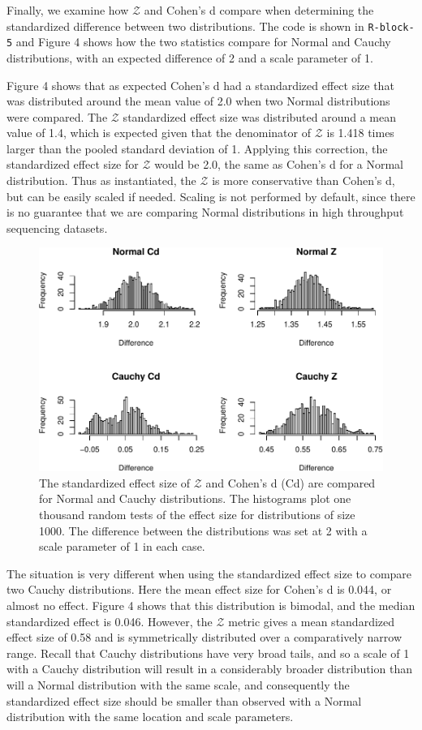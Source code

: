\documentclass[onecolumn]{article}
\begin{document}
Finally, we examine how \(\mathcal{Z}\) and Cohen's d compare when
determining the standardized difference between two distributions. The
code is shown in \texttt{R-block-5} and Figure 4 shows how the two
statistics compare for Normal and Cauchy distributions, with an expected
difference of 2 and a scale parameter of 1.

Figure 4 shows that as expected Cohen's d had a standardized effect size
that was distributed around the mean value of 2.0 when two Normal
distributions were compared. The \(\mathcal{Z}\) standardized effect
size was distributed around a mean value of 1.4, which is expected given
that the denominator of \(\mathcal{Z}\) is 1.418 times larger than the
pooled standard deviation of 1. Applying this correction, the
standardized effect size for \(\mathcal{Z}\) would be 2.0, the same as
Cohen's d for a Normal distribution. Thus as instantiated, the
\(\mathcal{Z}\) is more conservative than Cohen's d, but can be easily
scaled if needed. Scaling is not performed by default, since there is no
guarantee that we are comparing Normal distributions in high throughput
sequencing datasets.

\begin{figure}
\centering
\includegraphics{effect_supplement_files/figure-latex/R-block-5-1.pdf}
\caption{The standardized effect size of \(\mathcal{Z}\) and Cohen's d
(Cd) are compared for Normal and Cauchy distributions. The histograms
plot one thousand random tests of the effect size for distributions of
size 1000. The difference between the distributions was set at 2 with a
scale parameter of 1 in each case.}
\end{figure}

The situation is very different when using the standardized effect size
to compare two Cauchy distributions. Here the mean effect size for
Cohen's d is 0.044, or almost no effect. Figure 4 shows that this
distribution is bimodal, and the median standardized effect is 0.046.
However, the \(\mathcal{Z}\) metric gives a mean standardized effect
size of 0.58 and is symmetrically distributed over a comparatively
narrow range. Recall that Cauchy distributions have very broad tails,
and so a scale of 1 with a Cauchy distribution will result in a
considerably broader distribution than will a Normal distribution with
the same scale, and consequently the standardized effect size should be
smaller than observed with a Normal distribution with the same location
and scale parameters.
\end{document}
